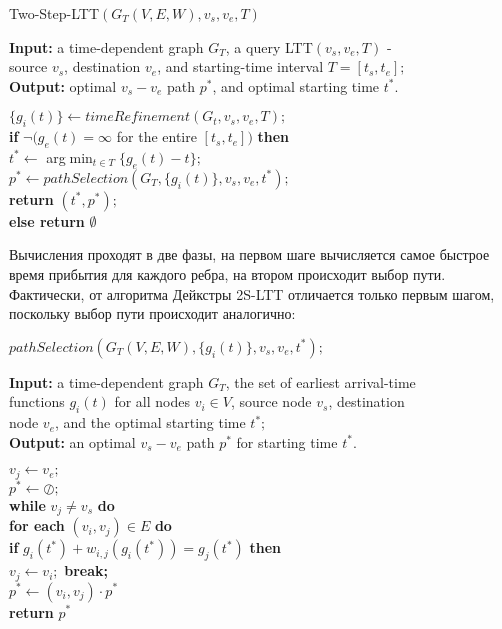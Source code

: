 \documentclass[12pt]{article}
\begin{document}
\begin{algorithm}
\caption{Two-Step-LTT$(G_T(V,E,W),v_s,v_e,T)$}
\textbf{Input:} a time-dependent graph $G_T$, a query LTT$(v_s,v_e,T)$ - \\
source $v_s$, destination $v_e$, and starting-time interval $T = [t_s,t_e];$ \\
\textbf{Output:} optimal $v_s-v_e$ path $p^*$, and optimal starting time $t^*$. \\
\begin{algorithmic}[1]
\State $\{g_i(t)\} \gets timeRefinement(G_t,v_s,v_e,T);$ \\
\textbf{if} $\neg (g_e(t) = \infty $ for the entire $[t_s,t_e])$ \textbf{then} \\
\qquad $t^* \gets$ arg$\min_{t \in T} \{g_e(t)-t\};$ \\
\qquad $p^* \gets pathSelection(G_T, \{g_i(t)\},v_s,v_e,t^*);$ \\
\qquad \textbf{return} $(t^*,p^*);$ \\
\textbf{else return} $\emptyset$
\end{algorithmic}
\end{algorithm}

Вычисления проходят в две фазы, на первом шаге вычисляется самое быстрое время прибытия для каждого ребра, на втором происходит выбор пути. Фактически, от алгоритма Дейкстры 2S-LTT отличается только первым шагом, поскольку выбор пути происходит аналогично:

\begin{algorithm}
\caption{$pathSelection(G_T(V,E,W), \{g_i(t)\},v_s,v_e,t^*);$}
\textbf{Input:} a time-dependent graph $G_T$, the set of earliest arrival-time \\
functions $g_i(t)$  for all nodes $v_i \in V$, source node $v_s$, destination \\
node $v_e$, and the optimal starting time $t^*;$ \\
\textbf{Output:} an optimal $v_s-v_e$ path $p^*$ for starting time $t^*$. \\
\begin{algorithmic}[1]
\State $v_j \gets v_e;$ \\
$p^* \gets \oslash;$ \\
\textbf{while} $v_j \neq v_s$ \textbf{do} \\
\qquad \textbf{for each} $(v_i,v_j) \in E$ \textbf{do} \\
\qquad \qquad \textbf{if} $g_i(t^*) + w_{i,j}(g_i(t^*)) = g_j(t^*)$ \textbf{then} \\
\qquad \qquad \qquad $v_j \gets v_i;$ \textbf{break;}\\
\qquad $p^* \gets (v_i,v_j)\cdot p^*$ \\
\textbf{return} $p^*$
\end{algorithmic}
\end{algorithm}
\end{document}
